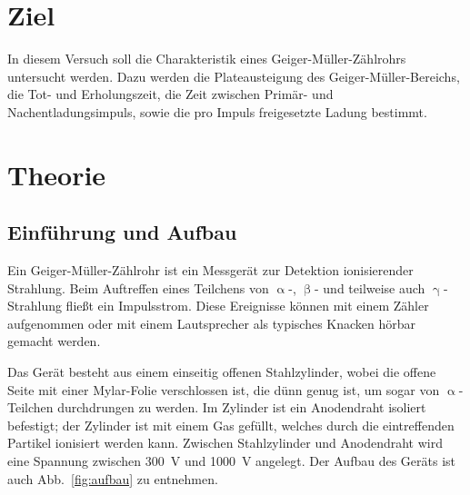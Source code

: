 \section{Ziel}
\label{sec:Ziel}

In diesem Versuch soll die Charakteristik eines Geiger-Müller-Zählrohrs untersucht werden. Dazu werden die Plateausteigung des Geiger-Müller-Bereichs, die Tot- und Erholungszeit, die Zeit zwischen Primär- und Nachentladungsimpuls, sowie die pro Impuls freigesetzte Ladung bestimmt.

\section{Theorie}
\label{sec:theorie}
\subsection{Einführung und Aufbau}
Ein Geiger-Müller-Zählrohr ist ein Messgerät zur Detektion ionisierender Strahlung. Beim Auftreffen eines Teilchens von $\upalpha$-, $\upbeta$- und teilweise auch $\upgamma$-Strahlung fließt ein Impulsstrom. Diese Ereignisse können mit einem Zähler aufgenommen oder mit einem Lautsprecher als typisches Knacken hörbar gemacht werden.

Das Gerät besteht aus einem einseitig offenen Stahlzylinder, wobei die offene Seite mit einer Mylar-Folie verschlossen ist, die dünn genug ist, um sogar von $\upalpha$-Teilchen durchdrungen zu werden. Im Zylinder ist ein Anodendraht isoliert befestigt; der Zylinder ist mit einem Gas gefüllt, welches durch die eintreffenden Partikel ionisiert werden kann. Zwischen Stahlzylinder und Anodendraht wird eine Spannung zwischen \SI{300}{\volt} und \SI{1000}{\volt} angelegt. Der Aufbau des Geräts ist auch Abb.~\ref{fig:aufbau} zu entnehmen.


